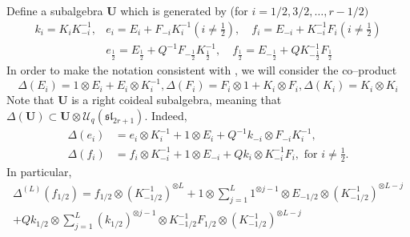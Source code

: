 \documentclass[12pt]{ximera}
\begin{document}
Define a subalgebra $\mathbf{U}$ which is generated by (for $i=1/2,3/2,\ldots,r-1/2)$
$$
\begin{array}{cl}k_{i}=K_{i} K_{-i}^{-1}, & e_{i}=E_{i}+F_{-i} K_{i}^{-1}\left(i \neq \frac{1}{2}\right), \quad f_{i}=E_{-i}+K_{-i}^{-1} F_{i}\left(i \neq \frac{1}{2}\right) \\ & e_{\frac{1}{2}}=E_{\frac{1}{2}}+Q^{-1} F_{-\frac{1}{2}} K_{\frac{1}{2}}^{-1}, \quad f_{\frac{1}{2}}=E_{-\frac{1}{2}}+Q K_{-\frac{1}{2}}^{-1} F_{\frac{1}{2}}\end{array}
$$
In order to make the notation consistent with \cite{BWW}, we will consider the co--product
$$
\Delta\left(E_{i}\right)=1 \otimes E_{i}+E_{i} \otimes K_{i}^{-1}, \Delta\left(F_{i}\right)=F_{i} \otimes 1+K_{i} \otimes F_{i}, \Delta\left(K_{i}\right)=K_{i} \otimes K_{i}
$$
Note that $\mathbf{U}$ is a right coideal subalgebra, meaning that $\Delta(\mathbf{U}) \subset \mathbf{U} \otimes \mathcal{U}_q(\mathfrak{sl}_{2r+1})$. Indeed, 
\begin{align*}
\Delta(e_i) &= e_i \otimes K_i^{-1} + 1 \otimes E_i + Q^{-1} k_{-i} \otimes F_{-i}K_i^{-1} ,\\
\Delta(f_i) &= f_i \otimes K_{-i}^{-1} + 1\otimes E_{-i} + Q k_i \otimes K_{-i}^{-1}F_i, \text{ for } i\neq \tfrac{1}{2}.
\end{align*}
In particular, 
\begin{multline*}
\Delta^{(L)} (f_{1/2}) = f_{1/2} \otimes (K_{-1/2}^{-1} )^{\otimes L} + 1 \otimes \sum_{j=1}^{L} 1^{\otimes j-1} \otimes E_{-1/2} \otimes (K_{-1/2}^{-1})^{\otimes L-j} \\
+Q k_{1/2} \otimes \sum_{j=1}^{L} (k_{1/2})^{\otimes j-1} \otimes K_{-1/2}^{-1}F_{1/2} \otimes (K_{-1/2}^{-1})^{\otimes L-j}
\end{multline*}
\end{document}
